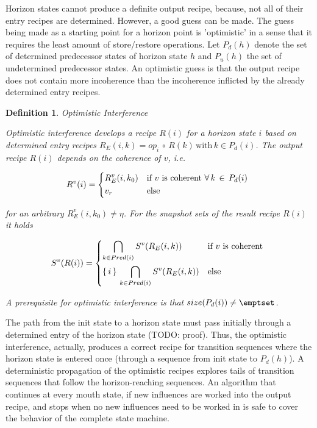 \documentclass[12pt,a4paper]{scrartcl}
\newtheorem{definition}{Definition}
\begin{document}
Horizon states cannot produce a definite output recipe, because, not all of
their entry recipes are determined. However, a good guess can be made.  The
guess being made as a starting point for a horizon point is 'optimistic' in a sense
that it requires the least amount of store/restore operations. Let $P_d(h)$
denote the set of determined predecessor states of horizon state $h$ and
$P_u(h)$ the set of undetermined predecessor states. An optimistic guess is
that the output recipe does not contain more incoherence than the incoherence
inflicted by the already determined entry recipes.

\begin{definition} Optimistic Interference

    Optimistic interference develops a recipe $R(i)$ for a horizon state $i$
    based on determined entry recipes $R_E(i,k) =
    op_i\,\circ\,R(k)\,\mbox{with}\,k \in P_d(i)$.  The output recipe $R(i)$
    depends on the coherence of $v$, i.e. 

    \begin{equation} \label{eq:opt-interference-output}
        R^v(i) = 
        \begin{dcases*}
            R_E^v(i,k_0) & if $v$ is coherent $\forall\,k\,\in\,P_d(i)$ \\
            v_r         & else
        \end{dcases*}
    \end{equation}

    for an arbitrary $R_E^v(i,k_0)\neq\eta$. For the snapshot sets of the
    result recipe $R(i)$ it holds

    \begin{equation} \label{eq:interference-snapshot-sets}
        S^v(R(i)) = 
        \begin{dcases*}
            \bigcap_{k\in Pred(i)} S^v(R_E(i,k))            & if $v$ is coherent \\
            \{\,i\,\}\,\bigcap_{k\in Pred(i)} S^v(R_E(i,k)) & else \\
        \end{dcases*}
    \end{equation}

    A prerequisite for optimistic interference is that 
    $size(P_d(i)) \neq \emptset$.

\end{definition}

The path from the init state to a horizon state must pass initially through a
determined entry of the horizon state (TODO: proof). Thus, the optimistic
interference, actually, produces a correct recipe for transition sequences
where the horizon state is entered once (through a sequence from init state to
$P_d(h)$). A deterministic propagation of the optimistic recipes explores tails
of transition sequences that follow the horizon-reaching sequences. An algorithm
that continues at every mouth state, if new influences are worked into the 
output recipe, and stops when no new influences need to be worked in is safe
to cover the behavior of the complete state machine. 
\end{document}
